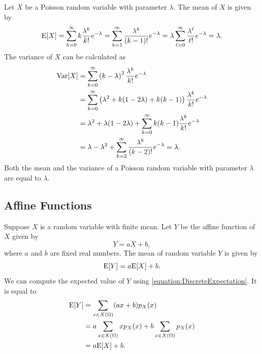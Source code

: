 \begin{example}
Let $X$ be a Poisson random variable with parameter $\lambda$.
The mean of $X$ is given by
\begin{equation*}
\mathrm{E} [X] = \sum_{k=0}^{\infty} k \frac{\lambda^k}{k!} e^{- \lambda}
= \sum_{k=1}^{\infty} \frac{\lambda^k}{(k-1)!} e^{- \lambda}
= \lambda \sum_{\ell=0}^{\infty} \frac{\lambda^\ell}{\ell!} e^{- \lambda}
= \lambda .
\end{equation*}
The variance of $X$ can be calculated as
\begin{equation*}
\begin{split}
\mathrm{Var} [X] &= \sum_{k=0}^{\infty} \left( k - \lambda \right)^2
\frac{\lambda^k}{k!} e^{- \lambda} \\
&= \sum_{k=0}^{\infty} \left(\lambda^2 + k (1 - 2 \lambda) + k(k-1) \right)
\frac{\lambda^k}{k!} e^{- \lambda} \\
&= \lambda^2 + \lambda (1 - 2 \lambda)
+ \sum_{k=0}^{\infty} k(k-1) \frac{\lambda^k}{k!} e^{- \lambda} \\
&= \lambda - \lambda^2
+ \sum_{k=2}^{\infty} \frac{\lambda^k}{(k-2)!} e^{- \lambda}
= \lambda .
\end{split}
\end{equation*}
Both the mean and the variance of a Poisson random variable with parameter $\lambda$ are equal to $\lambda$.
\end{example}


\subsection{Affine Functions}

Suppose $X$ is a random variable with finite mean.
Let $Y$ be the affine function of $X$ given by
\begin{equation*}
Y = aX + b,
\end{equation*}
where $a$ and $b$ are fixed real numbers.
The mean of random variable $Y$ is given by
\begin{equation*}
\mathrm{E} [Y] = a \mathrm{E} [X] + b.
\end{equation*}
We can compute the expected value of $Y$ using \eqref{equation:DiscreteExpectation}.
It is equal to
\begin{equation*}
\begin{split}
\mathrm{E} [Y] &= \sum_{x \in X(\Omega)} (ax + b) p_X(x) \\
&= a \sum_{x \in X(\Omega)} x p_X(x) + b \sum_{x \in X(\Omega)} p_X(x) \\
&= a \mathrm{E} [X] + b.
\end{split}
\end{equation*}


